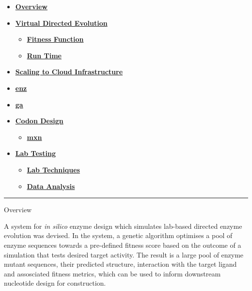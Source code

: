 \begin{itemize}
\tightlist
\item
  \protect\hyperlink{overview}{\textbf{Overview}}
\item
  \protect\hyperlink{vde}{\textbf{Virtual Directed Evolution }}

  \begin{itemize}
  \tightlist
  \item
    \protect\hyperlink{sfxn}{\textbf{Fitness Function }}
  \item
    \protect\hyperlink{run}{\textbf{Run Time }}
  \end{itemize}
\item
  \protect\hyperlink{k8}{\textbf{Scaling to Cloud Infrastructure }}
\item
  \protect\hyperlink{enz}{\textbf{enz }}
\item
  \protect\hyperlink{ga}{\textbf{ga }}
\item
  \protect\hyperlink{codons}{\textbf{Codon Design }}

  \begin{itemize}
  \tightlist
  \item
    \protect\hyperlink{mxn}{\textbf{mxn }}
  \end{itemize}
\item
  \protect\hyperlink{lab}{\textbf{Lab Testing }}

  \begin{itemize}
  \tightlist
  \item
    \protect\hyperlink{labtech}{\textbf{Lab Techniques}}
  \item
    \protect\hyperlink{analysis}{\textbf{Data Analysis }}
  \end{itemize}
\end{itemize}

\begin{center}\rule{0.5\linewidth}{0.5pt}\end{center}

Overview

A system for \emph{in silico} enzyme design which simulates lab-based
directed enzyme evolution was devised. In the system, a genetic
algorithm optimises a pool of enzyme sequences towards a pre-defined
fitness score based on the outcome of a simulation that tests desired
target activity. The result is a large pool of enzyme mutant sequences,
their predicted structure, interaction with the target ligand and
assosciated fitness metrics, which can be used to inform downstream
nucleotide design for construction.

